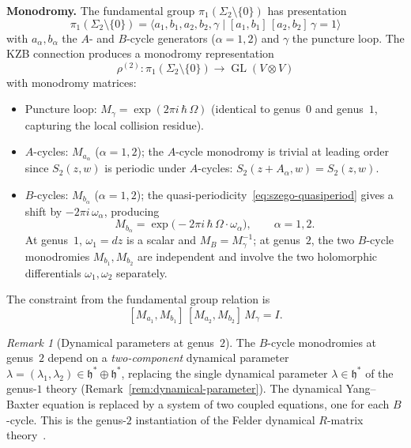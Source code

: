 \documentclass[11pt,reqno]{amsart}
\theoremstyle{definition}
\theoremstyle{remark}
\newtheorem{remark}[theorem]{Remark}
\newcommand{\fh}{\mathfrak{h}}
\numberwithin{equation}{section}
\begin{document}
\smallskip
\noindent
\textbf{Monodromy.}
The fundamental group
$\pi_1(\Sigma_2 \setminus \{0\})$ has presentation
\begin{equation}\label{eq:fund-gp-g2}
  \pi_1(\Sigma_2 \setminus \{0\})
  = \bigl\langle
  a_1, b_1, a_2, b_2, \gamma
  \;\big|\;
  [a_1, b_1]\,[a_2, b_2]\,\gamma = 1
  \bigr\rangle
\end{equation}
with $a_\alpha, b_\alpha$ the $A$- and $B$-cycle
generators ($\alpha = 1, 2$) and $\gamma$ the puncture
loop. The KZB connection produces a monodromy
representation
\begin{equation}\label{eq:monodromy-rep-g2}
  \rho^{(2)} \colon
  \pi_1(\Sigma_2 \setminus \{0\})
  \to \operatorname{GL}(V \otimes V)
\end{equation}
with monodromy matrices:
\begin{itemize}
\item Puncture loop:
  $M_\gamma = \exp(2\pi i\,\hbar\,\Omega)$
  (identical to genus~$0$ and genus~$1$, capturing
  the local collision residue).
\item $A$-cycles:
  $M_{a_\alpha}$ ($\alpha = 1, 2$); the $A$-cycle
  monodromy is trivial at leading order since
  $S_2(z, w)$ is periodic under $A$-cycles:
  $S_2(z + A_\alpha, w) = S_2(z, w)$.
\item $B$-cycles:
  $M_{b_\alpha}$ ($\alpha = 1, 2$); the
  quasi-periodicity~\eqref{eq:szego-quasiperiod} gives
  a shift by $-2\pi i\,\omega_\alpha$, producing
  \begin{equation}\label{eq:b-monodromy-g2}
    M_{b_\alpha}
    = \exp\!\bigl(-2\pi i\,\hbar\,
    \Omega \cdot \omega_\alpha\bigr),
    \qquad \alpha = 1, 2.
  \end{equation}
  At genus~$1$, $\omega_1 = dz$ is a scalar and
  $M_B = M_\gamma^{-1}$; at genus~$2$, the two $B$-cycle
  monodromies $M_{b_1}, M_{b_2}$ are independent and
  involve the two holomorphic differentials
  $\omega_1, \omega_2$ separately.
\end{itemize}
The constraint from the fundamental group relation is
\begin{equation}\label{eq:constraint-g2}
  [M_{a_1}, M_{b_1}]\,
  [M_{a_2}, M_{b_2}]\,
  M_\gamma = I.
\end{equation}

\begin{remark}[Dynamical parameters at genus~$2$]
\label{rem:dynamical-g2}
The $B$-cycle monodromies at genus~$2$ depend on a
\emph{two-component} dynamical parameter
$\lambda = (\lambda_1, \lambda_2) \in \fh^* \oplus \fh^*$,
replacing the single dynamical parameter $\lambda \in \fh^*$
of the genus-$1$ theory
(Remark~\textup{\ref{rem:dynamical-parameter}}).
The dynamical Yang--Baxter equation is replaced by a
system of two coupled equations, one for each $B$-cycle.
This is the genus-$2$ instantiation of the Felder dynamical
$R$-matrix theory~\cite{Felder94,FelderVarchenko96}.
\end{remark}
\end{document}
